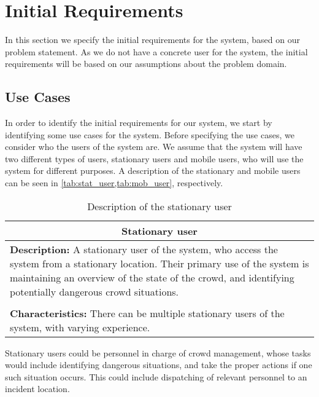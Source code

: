 \section{Initial Requirements}\label{sec:s1_requirements}
In this section we specify the initial requirements for the system, based on our problem statement. As we do not have a concrete user for the system, the initial requirements will be based on our assumptions about the problem domain. 

\subsection{Use Cases}
In order to identify the initial requirements for our system, we start by identifying some use cases for the system. Before specifying the use cases, we consider who the users of the system are. We assume that the system will have two different types of users, stationary users and mobile users, who will use the system for different purposes. A description of the stationary and mobile users can be seen in \cref{tab:stat_user,tab:mob_user}, respectively.

\begin{table}[h!]
    \centering
    \begin{tabularx}{/8}{X}
        \toprule
        \multicolumn{1}{c}{\textbf{Stationary user}} \\ 
        \midrule
        \textbf{Description:} A stationary user of the system, who access the system from a stationary location. Their primary use of the system is maintaining an overview of the state of the crowd, and identifying potentially dangerous crowd situations. \\
        \\
        \textbf{Characteristics:} There can be multiple stationary users of the system, with varying experience. \\
        \bottomrule
    \end{tabularx}
    \caption{Description of the stationary user}
    \label{tab:stat_user}
\end{table}

Stationary users could be personnel in charge of crowd management, whose tasks would include identifying dangerous situations, and take the proper actions if one such situation occurs. This could include dispatching of relevant personnel to an incident location.

